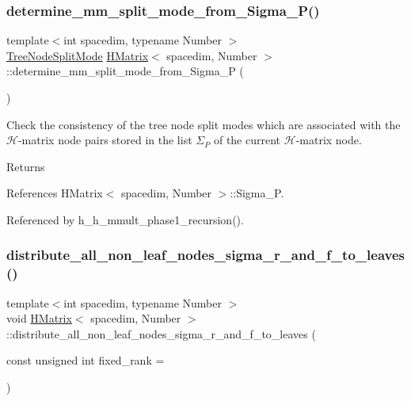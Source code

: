 \subsubsection{\texorpdfstring{determine\+\_\+mm\+\_\+split\+\_\+mode\+\_\+from\+\_\+\+Sigma\+\_\+\+P()}{determine\_mm\_split\_mode\_from\_Sigma\_P()}}
{\footnotesize\ttfamily template$<$int spacedim, typename Number $>$ \\
\hyperlink{tree_8h_a922ca07db9633957939f697a65aff11d}{Tree\+Node\+Split\+Mode} \hyperlink{classHMatrix}{H\+Matrix}$<$ spacedim, Number $>$\+::determine\+\_\+mm\+\_\+split\+\_\+mode\+\_\+from\+\_\+\+Sigma\+\_\+P (\begin{DoxyParamCaption}{ }\end{DoxyParamCaption})}

Check the consistency of the tree node split modes which are associated with the $\mathcal{H}$-\/matrix node pairs stored in the list $\Sigma_P$ of the current $\mathcal{H}$-\/matrix node. \begin{DoxyReturn}{Returns}

\end{DoxyReturn}


References H\+Matrix$<$ spacedim, Number $>$\+::\+Sigma\+\_\+P.



Referenced by h\+\_\+h\+\_\+mmult\+\_\+phase1\+\_\+recursion().

\mbox{\label{classHMatrix_a66979dbdf56155c63f0706649e8545b9}} 
\subsubsection{\texorpdfstring{distribute\+\_\+all\+\_\+non\+\_\+leaf\+\_\+nodes\+\_\+sigma\+\_\+r\+\_\+and\+\_\+f\+\_\+to\+\_\+leaves()}{distribute\_all\_non\_leaf\_nodes\_sigma\_r\_and\_f\_to\_leaves()}}
{\footnotesize\ttfamily template$<$int spacedim, typename Number $>$ \\
void \hyperlink{classHMatrix}{H\+Matrix}$<$ spacedim, Number $>$\+::distribute\+\_\+all\+\_\+non\+\_\+leaf\+\_\+nodes\+\_\+sigma\+\_\+r\+\_\+and\+\_\+f\+\_\+to\+\_\+leaves (\begin{DoxyParamCaption}\item[{const unsigned int}]{fixed\+\_\+rank = {} }\end{DoxyParamCaption})\hspace{0.3cm}{\ttfamily [private]}}

